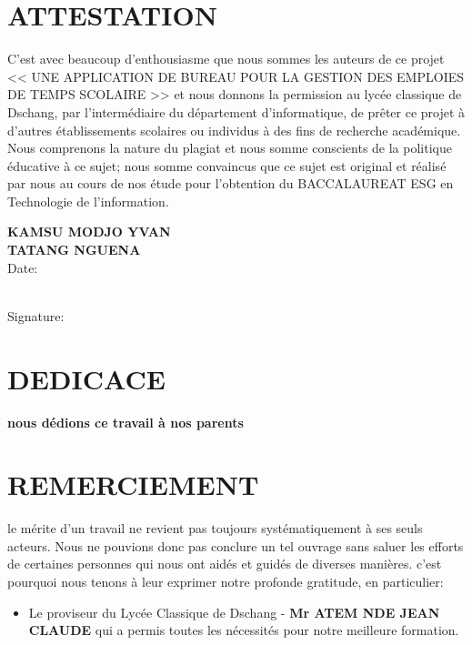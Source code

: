 \documentclass[english,12pt,a4paper]{report}
\begin{document}
\begin{spacing}{1.5}
\chapter*{ATTESTATION}
\hspace{1.2cm}
C'est avec beaucoup d'enthousiasme que nous sommes les auteurs de ce projet << UNE APPLICATION DE BUREAU POUR LA GESTION DES EMPLOIES DE TEMPS SCOLAIRE >> et nous donnons la permission au lycée classique de Dschang, par l'intermédiaire du département d'informatique, de prêter ce projet à d'autres établissements scolaires ou individus à des fins de recherche académique. Nous comprenons la nature du plagiat et nous somme conscients de la politique éducative à ce sujet; nous somme convaincus que ce sujet est original et réalisé par nous au cours de nos étude pour l'obtention du BACCALAUREAT ESG en Technologie de l'information.
\begin{center}
\vspace{1cm}
\vspace{0.2cm}
\textbf{KAMSU MODJO YVAN}\\
\textbf{TATANG NGUENA}\\
\vspace{0.2cm}
Date:
\\
\vspace{0.2cm}
Signature:
\end{center}
{}
\chapter*{DEDICACE}
\hspace{1.2cm} 
\begin{center}
	\textbf{nous dédions ce travail à nos parents}
\end{center}
\vspace{-1.5cm}
\chapter*{REMERCIEMENT}
\vspace{-1.5cm}
\hspace{1.cm}
le mérite d'un travail ne revient pas toujours systématiquement à ses seuls acteurs. Nous ne pouvions donc pas conclure un tel ouvrage sans saluer les efforts de certaines personnes qui nous ont aidés et guidés de diverses manières. c'est pourquoi nous tenons à leur exprimer notre profonde gratitude, en particulier:
\begin{itemize}[label=\textbullet, font=\LARGE %
	]
	\item Le proviseur du Lycée Classique de Dschang - \textbf{Mr ATEM NDE JEAN CLAUDE} qui a permis toutes les nécessités pour notre meilleure formation.
	

\end{itemize}
\end{spacing}
\end{document}
